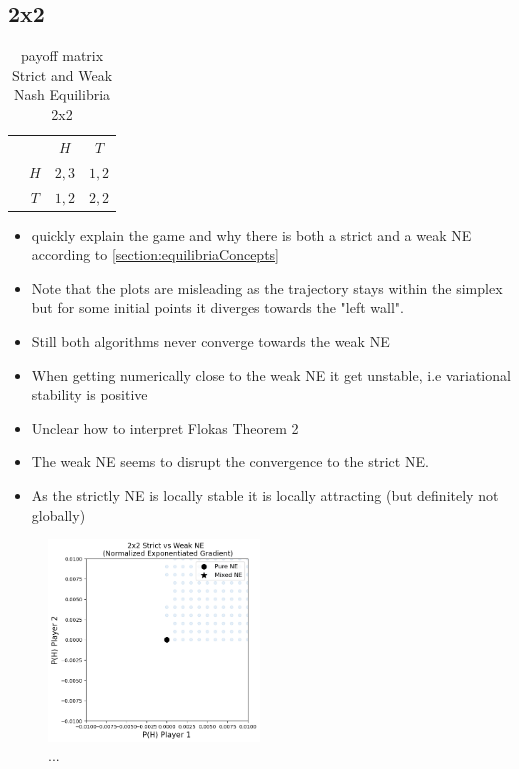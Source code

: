 \subsection{2x2}\label{subsection:2x2}

\begin{table}\centering
\setlength{\extrarowheight}{2pt}
\begin{tabular}{cc|c|c|}
  & \multicolumn{1}{c}{} & \multicolumn{1}{c}{$H$}  & \multicolumn{1}{c}{$T$} \\\cline{3-4}
  & $H$ & $2,3$ & $1,2$ \\\cline{3-4}
  & $T$ & $1,2$ & $2,2$ \\\cline{3-4}
\end{tabular}\caption{\label{tab:payoffStrictAndWeak2x2}payoff matrix Strict and Weak Nash Equilibria 2x2}
\end{table}

\begin{itemize}
    \item quickly explain the game and why there is both a strict and a weak NE according to \ref{section:equilibriaConcepts}
    \item Note that the plots are misleading as the trajectory stays within the simplex but for some initial points
    it diverges towards the "left wall". 
    \item Still both algorithms never converge towards the weak NE
    \item When getting numerically close to the weak NE it get unstable, i.e variational stability is positive
    \item Unclear how to interpret \cite{flokas} Flokas Theorem 2 
    \item The weak NE seems to disrupt the convergence to the strict NE. 
    \item As the strictly NE is locally stable it is locally attracting (but definitely not globally)
\end{itemize}

\begin{figure}
    \centering
    \includegraphics[width=0.5\textwidth]{logos/Weak1.png}
    \caption{...}
    \label{Weak1}
\end{figure}

